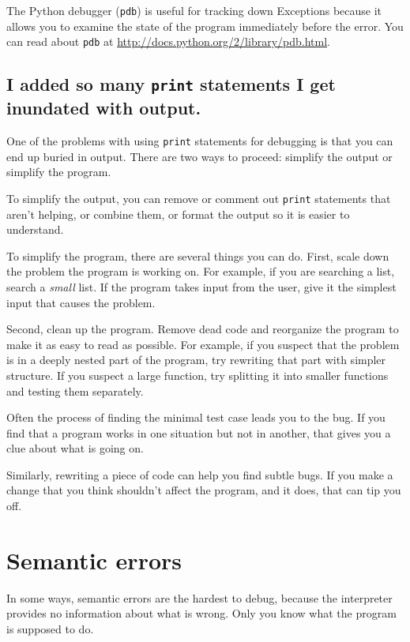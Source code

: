 \documentclass[10pt]{book}
\begin{document}
The Python debugger ({\tt pdb}) is useful for tracking down
Exceptions because it allows you to examine the state of the
program immediately before the error.  You can read
about {\tt pdb} at \url{http://docs.python.org/2/library/pdb.html}.


\subsection{I added so many {\tt print} statements I get inundated with
output.}

One of the problems with using {\tt print} statements for debugging
is that you can end up buried in output.  There are two ways
to proceed: simplify the output or simplify the program.

To simplify the output, you can remove or comment out {\tt print}
statements that aren't helping, or combine them, or format
the output so it is easier to understand.

To simplify the program, there are several things you can do.  First,
scale down the problem the program is working on.  For example, if you
are searching a list, search a {\em small} list.  If the program takes
input from the user, give it the simplest input that causes the
problem.

Second, clean up the program.  Remove dead code and reorganize the
program to make it as easy to read as possible.  For example, if you
suspect that the problem is in a deeply nested part of the program,
try rewriting that part with simpler structure.  If you suspect a
large function, try splitting it into smaller functions and testing them
separately.

Often the process of finding the minimal test case leads you to the
bug.  If you find that a program works in one situation but not in
another, that gives you a clue about what is going on.

Similarly, rewriting a piece of code can help you find subtle
bugs.  If you make a change that you think shouldn't affect the
program, and it does, that can tip you off.


\section{Semantic errors}

In some ways, semantic errors are the hardest to debug,
because the interpreter provides no information
about what is wrong.  Only you know what the program is supposed to
do.
\end{document}
